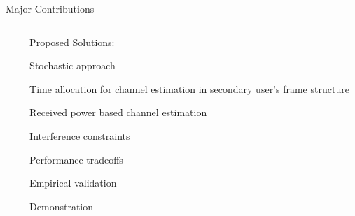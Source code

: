 \documentclass[16pt]{beamer}
\newcommand{\fs}[2]{\fontsize{#1 pt}{#2}\selectfont}
\begin{document}
\begin{frame}[t]{Major Contributions}
\begin{columns}
		\begin{column}{0.0\columnwidth}
		\end{column}
		
		\begin{column}[t]{0.44\columnwidth}
			\centering Proposed Solutions: \\[-0.2em]
			\fs{8}{8}
			\begin{block}{}
				\centering
			  	Stochastic approach%
			\end{block}
			\vspace{-0.5mm}
			\begin{block}{}
				\centering
			   	Time allocation for channel estimation in secondary user's frame structure
			\end{block}
			\vspace{-0.5mm}
			\onslide<2->
			{
			\begin{block}{}
				\centering
				Received power based channel estimation
			\end{block}
			}
			\vspace{7.0mm}
			\onslide<3->
			{
			\begin{block}{}
				\centering
			  	Interference constraints  %
			\end{block}
			}	
			\vspace{-0.5mm}
			\onslide<3->
			{
			\begin{block}{}
				\centering
			 	Performance tradeoffs %
			\end{block}
			}
			\vspace{-0.5mm}
			\onslide<4->
			{
			\begin{block}{}
				\centering
				Empirical validation 
			\end{block}
			\vspace{-0.5mm}
			\onslide<4->
			\begin{block}{}
				\centering
				Demonstration
			\end{block}
			}
		\end{column}
	\end{columns}
\end{frame}
\end{document}
